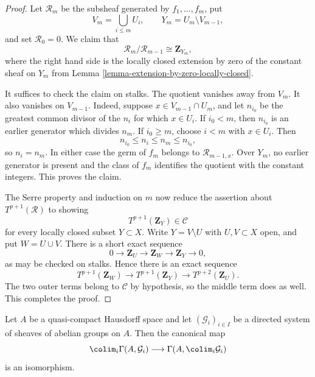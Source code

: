 \begin{proof}
Let $\mathcal{R}_m$ be the subsheaf generated by $f_1,\ldots,f_m$, put
$$
V_m=\bigcup_{i\leq m}U_i,
\qquad
Y_m=U_m\setminus V_{m-1},
$$
and set $\mathcal{R}_0=0$. We claim that
$$
\mathcal{R}_m/\mathcal{R}_{m-1}\cong\mathbf{Z}_{Y_m},
$$
where the right hand side is the locally closed extension by zero of the
constant sheaf on $Y_m$ from Lemma
\ref{lemma-extension-by-zero-locally-closed}.

It suffices to check the claim on stalks. The quotient vanishes away from
$V_m$. It also vanishes on $V_{m-1}$. Indeed, suppose
$x\in V_{m-1}\cap U_m$, and let $n_{i_0}$ be the greatest common divisor
of the $n_i$ for which $x\in U_i$. If $i_0<m$, then $n_{i_0}$ is an
earlier generator which divides $n_m$. If $i_0\geq m$, choose
$i<m$ with $x\in U_i$. Then
$$
n_{i_0}\leq n_i\leq n_m\leq n_{i_0},
$$
so $n_i=n_m$. In either case the germ of $f_m$ belongs to
$\mathcal{R}_{m-1,x}$. Over $Y_m$, no earlier generator is present and
the class of $f_m$ identifies the quotient with the constant integers.
This proves the claim.

The Serre property and induction on $m$ now reduce the assertion about
$T^{p+1}(\mathcal{R})$ to showing
$$
T^{p+1}(\mathbf{Z}_Y)\in\mathcal{C}
$$
for every locally closed subset $Y\subset X$. Write
$Y=V\setminus U$ with $U,V\subset X$ open, and put $W=U\cup V$. There is
a short exact sequence
$$
0\longrightarrow\mathbf{Z}_U\longrightarrow\mathbf{Z}_W
\longrightarrow\mathbf{Z}_Y\longrightarrow 0,
$$
as may be checked on stalks. Hence there is an exact sequence
$$
T^{p+1}(\mathbf{Z}_W)\longrightarrow
T^{p+1}(\mathbf{Z}_Y)\longrightarrow
T^{p+2}(\mathbf{Z}_U).
$$
The two outer terms belong to $\mathcal{C}$ by hypothesis, so the middle
term does as well. This completes the proof.
\end{proof}




\begin{lemma}
\label{lemma-compact-sections-colimit}
Let $A$ be a quasi-compact Hausdorff space and let
$(\mathcal{G}_i)_{i \in I}$ be a directed system of sheaves of abelian
groups on $A$. Then the canonical map
$$
\colim_i \Gamma(A, \mathcal{G}_i)
\longrightarrow
\Gamma(A, \colim_i \mathcal{G}_i)
$$
is an isomorphism.
\end{lemma}

